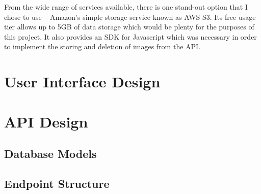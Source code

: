 From the wide range of services available, there is one stand-out option that I chose to use -- Amazon's simple storage service known as AWS S3. Its free usage tier allows up to 5GB of data storage which would be plenty for the purposes of this project. It also provides an SDK for Javascript which was necessary in order to implement the storing and deletion of images from the API.

\section{User Interface Design}



\section{API Design}


\subsection{Database Models}


\subsection{Endpoint Structure}